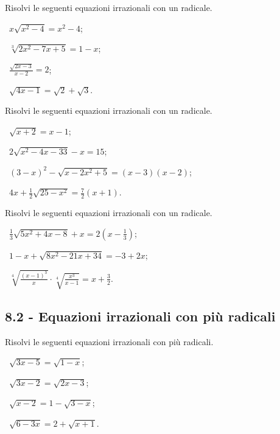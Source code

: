 \begin{esercizio}[\Ast]
 \label{ese:8.7}
Risolvi le seguenti equazioni irrazionali con un radicale.
\begin{multicols}{2}
 \begin{enumeratea}
 \item~$x\sqrt{x^2-4}=x^2-4$;
 \item~$\sqrt[3]{2x^2-7x+5}=1-x$;
 \item~$\frac{\sqrt{2x-3}}{x-2}=2$;
 \item~$\sqrt{4x-1}=\sqrt 2+\sqrt 3$.
 \end{enumeratea}
 \end{multicols}
\end{esercizio}
\newpage
\begin{esercizio}[\Ast]
 \label{ese:8.8}
Risolvi le seguenti equazioni irrazionali con un radicale.
\begin{multicols}{2}
 \begin{enumeratea}
 \item~$\sqrt{x+2}=x-1$;
 \item~$2\sqrt{x^2-4x-33}-x=15$;
 \item~$(3-x)^2-\sqrt{x-2x^2+5}=(x-3)(x-2)$;
 \item~$4x+\frac 1 2\sqrt{25-x^2}=\frac 7 2(x+1)$.
 \end{enumeratea}
 \end{multicols}
\end{esercizio}

\begin{esercizio}[\Ast]
 \label{ese:8.9}
Risolvi le seguenti equazioni irrazionali con un radicale.
\begin{multicols}{2}
 \begin{enumeratea}
 \item~$\frac 1 3\sqrt{5x^2+4x-8}+x=2\left(x-\frac 1 3\right)$;
 \item~$1-x+\sqrt{8x^2-21x+34}=-3+2x$;
 \item~$\sqrt[4]{\frac{(x-1)^3} x}\cdot \sqrt[4]{\frac{x^3}{x-1}}=x+\frac 3 2$.
 \end{enumeratea}
 \end{multicols}
\end{esercizio}

\subsection*{8.2 - Equazioni irrazionali con più radicali}

\begin{esercizio}[\Ast]
 \label{ese:8.10}
Risolvi le seguenti equazioni irrazionali con più radicali.
\begin{multicols}{2}
 \begin{enumeratea}
 \item~$\sqrt{3x-5}=\sqrt{1-x}$;
 \item~$\sqrt{3x-2}=\sqrt{2x-3}$;
 \item~$\sqrt{x-2}=1-\sqrt{3-x}$;
 \item~$\sqrt{6-3x}=2+\sqrt{x+1}$.
 \end{enumeratea}
 \end{multicols}
\end{esercizio}

